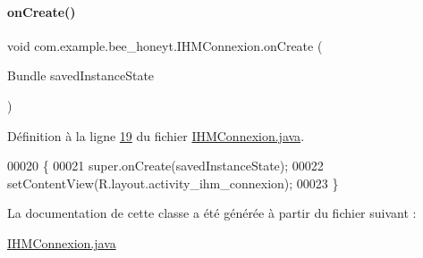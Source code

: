 \paragraph{\texorpdfstring{on\+Create()}{onCreate()}}
{\footnotesize\ttfamily void com.\+example.\+bee\+\_\+honeyt.\+I\+H\+M\+Connexion.\+on\+Create (\begin{DoxyParamCaption}\item[{Bundle}]{saved\+Instance\+State }\end{DoxyParamCaption})\hspace{0.3cm}{\ttfamily [protected]}}



Définition à la ligne \hyperlink{_i_h_m_connexion_8java_source_l00019}{19} du fichier \hyperlink{_i_h_m_connexion_8java_source}{I\+H\+M\+Connexion.\+java}.


\begin{DoxyCode}
00020     \{
00021         super.onCreate(savedInstanceState);
00022         setContentView(R.layout.activity\_ihm\_connexion);
00023     \}
\end{DoxyCode}


La documentation de cette classe a été générée à partir du fichier suivant \+:\begin{DoxyCompactItemize}
\item 
\hyperlink{_i_h_m_connexion_8java}{I\+H\+M\+Connexion.\+java}\end{DoxyCompactItemize}
